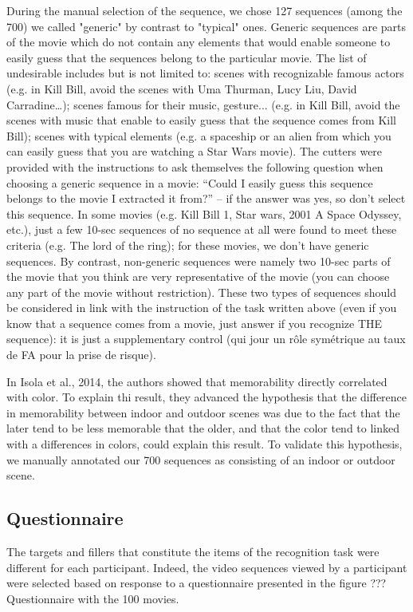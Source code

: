 \documentclass[sigconf]{acmart}
\begin{document}
During the manual selection of the sequence, we chose 127 sequences (among the 700) we called "generic" by contrast to "typical" ones. Generic sequences are parts of the movie which do not contain any elements that would enable someone to easily guess that the sequences belong to the particular movie. The list of undesirable includes but is not limited to: scenes with recognizable famous actors (e.g. in Kill Bill, avoid the scenes with Uma Thurman, Lucy Liu, David Carradine…); scenes famous for their music, gesture... (e.g. in Kill Bill, avoid the scenes with music that enable to easily guess that the sequence comes from Kill Bill); scenes with typical elements (e.g. a spaceship or an alien from which you can easily guess that you are watching a Star Wars movie). The cutters were provided with the instructions to ask themselves the following question when choosing a generic sequence in a movie: “Could I easily guess this sequence belongs to the movie I extracted it from?” -- if the answer was yes, so don’t select this sequence.
In some movies (e.g. Kill Bill 1, Star wars, 2001 A Space Odyssey, etc.), just a few 10-sec sequences of no sequence at all were found to meet these criteria (e.g. The lord of the ring); for these movies, we don't have generic sequences.
By contrast, non-generic sequences were namely two 10-sec parts of the movie that you think are very representative of the movie (you can choose any part of the movie without restriction).
These two types of sequences should be considered in link with the instruction of the task written above (even if you know that a sequence comes from a movie, just answer if you recognize THE sequence): it is just a supplementary control (qui jour un rôle symétrique au taux de FA pour la prise de risque).

In Isola et al., 2014, the authors showed that memorability directly correlated with color. To explain thi result, they advanced the hypothesis that the difference in memorability between indoor and outdoor scenes was due to the fact that the later tend to be less memorable that the older, and that the color tend to linked with a differences in colors, could explain this result. To validate this hypothesis, we manually annotated our 700 sequences as consisting of an indoor or outdoor scene. 


\subsection{Questionnaire}
The targets and fillers that constitute the items of the recognition task were different for each participant.
Indeed, the video sequences viewed by a participant were selected based on response to a questionnaire presented in the figure ???
Questionnaire with the 100 movies.
\end{document}
